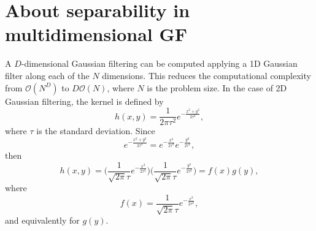 \documentclass{article}
\begin{document}

\section{About separability in multidimensional GF}

\label{ape:GF_separability}
A $D$-dimensional Gaussian filtering can be computed applying a 1D
Gaussian filter along each of the $N$ dimensions. This reduces the
computational complexity from $\mathcal{O}(N^D)$ to $D\mathcal{O}(N)$,
where $N$ is the problem size. In the case of 2D Gaussian filtering,
the kernel is defined by
\begin{equation}
  h(x,y) = \frac{1}{2\pi\tau^2}e^{-\frac{x^2+y^2}{2\tau^2}},
  \label{eq:2DGF}
\end{equation}
where $\tau$ is the standard deviation. Since
\begin{equation*}
  e^{-\frac{x^2+y^2}{2\tau^2}} = e^{-\frac{x^2}{2\tau^2}}e^{-\frac{y^2}{2\tau^2}},
\end{equation*}
then
\begin{equation}
  h(x,y) = \Big(\frac{1}{\sqrt{2\pi}\tau}e^{-\frac{x^2}{2\tau^2}}\Big)\Big(\frac{1}{\sqrt{2\pi}\tau}e^{-\frac{y^2}{2\tau^2}}\Big) = f(x)g(y),
\end{equation}
where
\begin{equation}
  f(x) = \frac{1}{\sqrt{2\pi}\tau}e^{-\frac{x^2}{2\tau^2}},
\end{equation}
and equivalently for $g(y)$.
\end{document}
